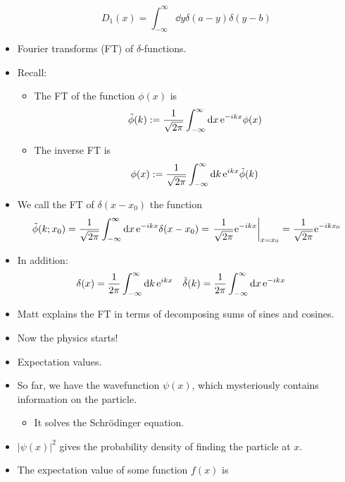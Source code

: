 \documentclass[../notes.tex]{subfiles}
\begin{document}
\begin{itemize}
\begin{equation*}
        D_1(x) = \int_{-\infty}^\infty\dd{y}\delta(a-y)\delta(y-b)
    \end{equation*}
    \item Fourier transforms (FT) of $\delta$-functions.
    \item Recall:
    \begin{itemize}
        \item The FT of the function $\phi(x)$ is
        \begin{equation*}
            \tilde{\phi}(k) := \frac{1}{\sqrt{2\pi}}\int_{-\infty}^\infty\dd{x}\e[-ikx]\phi(x)
        \end{equation*}
        \item The inverse FT is
        \begin{equation*}
            \phi(x) := \frac{1}{\sqrt{2\pi}}\int_{-\infty}^\infty\dd{k}\e[ikx]\tilde{\phi}(k)
        \end{equation*}
    \end{itemize}
    \item We call the FT of $\delta(x-x_0)$ the function
    \begin{equation*}
        \tilde{\phi}(k;x_0) = \frac{1}{\sqrt{2\pi}}\int_{-\infty}^\infty\dd{x}\e[-ikx]\delta(x-x_0)
        = \eval{\frac{1}{\sqrt{2\pi}}\e[-ikx]}_{x=x_0}
        = \frac{1}{\sqrt{2\pi}}\e[-ikx_0]
    \end{equation*}
    \item In addition:
    \begin{align*}
        \delta(x) &= \frac{1}{2\pi}\int_{-\infty}^\infty\dd{k}\e[ikx]&
        \tilde{\delta}(k) &= \frac{1}{2\pi}\int_{-\infty}^\infty\dd{x}\e[-ikx]
    \end{align*}
    \item Matt explains the FT in terms of decomposing sums of sines and cosines.
    \item Now the physics starts!
    \item Expectation values.
    \item So far, we have the wavefunction $\psi(x)$, which mysteriously contains information on the particle.
    \begin{itemize}
        \item It solves the Schr\"{o}dinger equation.
    \end{itemize}
    \item $|\psi(x)|^2$ gives the probability density of finding the particle at $x$.
    \item The expectation value of some function $f(x)$ is

\end{itemize}
\end{document}
